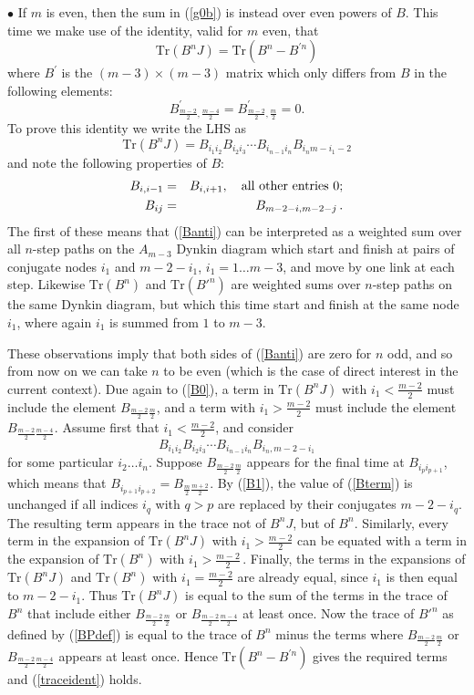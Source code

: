 \documentclass[11pt]{article}
\newcommand\beq{\begin{equation}}
\newcommand\eeq{\end{equation}}
\newcommand\beqa{\begin{eqnarray}}
\newcommand\eeqa{\end{eqnarray}}
\begin{document}
\medskip

\noindent $\bullet$ If $m$ is even, then the sum in (\ref{g0b}) is 
instead over even powers of $B$. This time we make use of the
identity, valid for $m$ even, that
\beq 
\mbox{Tr}(B^nJ)=\mbox{Tr}(B^n-B^{\prime n})
\label{traceident}
\eeq
where $B^{\prime}$ is the $(m-3)\times(m-3)$ matrix which only differs
from $B$ in the following elements:
\beq
B^{\prime}_{\frac{m-2}{2},\frac{m-4}{2}}=
B^{\prime}_{\frac{m-2}{2},\frac{m}{2}}=0.
\label{BPdef}
\eeq
To prove this identity we write the LHS as
\beq 
\mbox{Tr}(B^nJ)=
B_{i_1i_2}B_{i_2i_3}\cdots B_{i_{n-1}i_{n}}B_{i_{n}m-i_1-2}
\label{Banti}
\eeq
and note the following properties of $B$:
\beqa
B_{i,i-1}&=&B_{i,i+1}, \mbox{\quad all other entries $0$;}\label{B0}\\
B_{ij}&=&B_{m-2-i,m-2-j}\,.\label{B1}
\label{B2}
\eeqa
The first of these means that (\ref{Banti}) can be interpreted as a
weighted sum over all $n$-step paths on the $A_{m-3}$ Dynkin diagram which
start and finish at pairs of conjugate nodes
$i_1$ and
$m{-}2{-}i_1$, $i_1=1\dots m{-}3$,
and move by one link at each step.
Likewise $\mbox{Tr}(B^n)$ and $\mbox{Tr}(B'^n)$ are 
weighted sums over
$n$-step paths on the same Dynkin diagram, but which this time
start and finish at the same node $i_1$, where again $i_1$ is summed
from $1$ to $m{-}3$.

These observations imply that both sides of (\ref{Banti}) are zero for
$n$ odd, and so from now on we can take $n$ to be even (which is the
case of direct interest in the current context). 
Due again to (\ref{B0}), a term in $\mbox{Tr}(B^nJ)$ with
$i_1<\frac{m-2}{2}$ must include the element
$B_{\frac{m-2}{2}\frac{m}{2}}$, and a term with
$i_1>\frac{m-2}{2}$ must include the element
$B_{\frac{m-2}{2}\frac{m-4}{2}}$. 
Assume first that $i_1<\frac{m-2}{2}$, and consider
\beq
B_{i_1i_2}B_{i_2i_3}\cdots B_{i_{n-1}i_{n}}B_{i_{n},m-2-i_1}
\label{Bterm}
\eeq
for some particular $i_2\dots i_n$. Suppose
$B_{\frac{m-2}{2}\frac{m}{2}}$ appears for the final time at
$B_{i_pi_{p+1}}$, which means that
$B_{i_{p+1}i_{p+2}}=B_{\frac{m}{2}\frac{m+2}{2}}$. 
By (\ref{B1}), the value of (\ref{Bterm}) is unchanged if all
indices $i_q$ with $q>p$ are replaced by their conjugates
$m-2-i_q$. The resulting term appears in the
trace not of $B^nJ$, but of $B^n$. Similarly, every term in the
expansion of $\mbox{Tr}(B^nJ)$ with $i_1>\frac{m-2}{2}$ can be equated
with a term in the expansion of $\mbox{Tr}(B^n)$ with
$i_1>\frac{m-2}{2}$\,. Finally,
the terms in the expansions of $\mbox{Tr}(B^nJ)$ and $\mbox{Tr}(B^n)$
with $i_1=\frac{m-2}{2}$ are already equal, since $i_1$ is then equal
to $m-2-i_1$. Thus $\mbox{Tr}(B^nJ)$ is equal to the sum of the terms
in the trace of $B^n$ that include either
$B_{\frac{m-2}{2}\frac{m}{2}}$ or
$B_{\frac{m-2}{2}\frac{m-4}{2}}$ at least once. Now the trace of 
$B'^n$ as defined by (\ref{BPdef})
is equal to the trace of
$B^n$ minus the terms where $B_{\frac{m-2}{2}\frac{m}{2}}$ or
$B_{\frac{m-2}{2}\frac{m-4}{2}}$ appears at least once. Hence
$\mbox{Tr}(B^n-B^{\prime n})$ gives the required terms and
(\ref{traceident}) holds.
\end{document}
